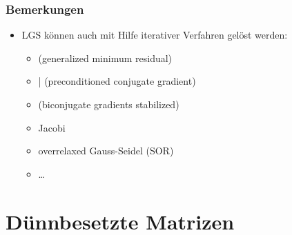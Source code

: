 \documentclass[hyperref={xetex}]{beamer}
\begin{document}
\begin{frame}[fragile]

\end{frame}
% 
%
\begin{frame}[fragile]\frametitle{Bemerkungen}
\begin{itemize}
\item LGS können auch mit Hilfe iterativer Verfahren gelöst werden:
\begin{itemize}
 \item {} (generalized minimum residual)
 \item {}|  (preconditioned conjugate gradient)
 \item {} (biconjugate gradients stabilized)
 \item Jacobi
 \item overrelaxed Gauss-Seidel (SOR)
\item \ldots
\end{itemize}
\end{itemize}
\end{frame}


\section{D\"unnbesetzte Matrizen}
\end{document}
